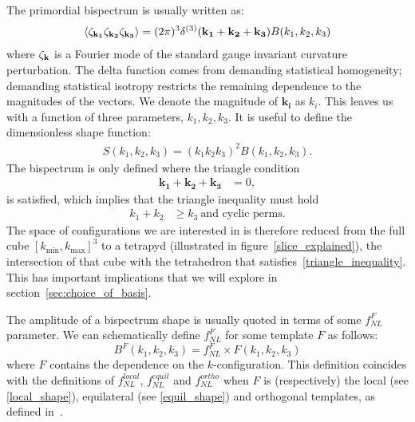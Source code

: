 \documentclass[a4paper,12pt]{extarticle}
\newcommand{\kmin}{{k_\text{min}}}
\newcommand{\kmax}{{k_\text{max}}}
\newcommand{\fnl}{f_{NL}}
\newcommand{\fnllocal}{f^{local}_{NL}}
\newcommand{\fnlequil}{f^{equil}_{NL}}
\newcommand{\fnlortho}{f^{ortho}_{NL}}
\begin{document}
The primordial bispectrum is usually written as:
\begin{align}
{
\left< \zeta_{\bf{k_1}}\zeta_{\bf{k_2}}\zeta_{\bf{k_3}} \right>
= (2\pi)^3\delta^{(3)}(\mathbf{k_1}+\mathbf{k_2}+\mathbf{k_3})B(k_1,k_2,k_3)
}
\end{align}
where $\zeta_{\bf{k}}$ is a Fourier mode of the standard gauge invariant curvature perturbation.
The delta function comes from demanding statistical homogeneity;
demanding statistical isotropy restricts the remaining dependence to the magnitudes of the vectors.
We denote the magnitude of $\mathbf{k_i}$ as $k_i$.
This leaves us with a function of three parameters,
$k_1,k_2,k_3$.
It is useful to define the dimensionless shape function:
\begin{align}\label{shapefn}
{
    S(k_1,k_2,k_3) = (k_1k_2k_3)^2B(k_1,k_2,k_3).
}
\end{align}
The bispectrum is only defined where the triangle condition
\begin{align}\label{triangle_condition}
    \mathbf{k_1}+\mathbf{k_2}+\mathbf{k_3} &= 0,
\end{align}
is satisfied, which implies that the triangle inequality must hold
\begin{align}\label{triangle_inequality}
    k_1+k_2 &\geq k_3~\text{and cyclic perms}.
\end{align}
The space of configurations we are interested in is therefore
reduced from the full cube $[\kmin,\kmax]^3$
to a tetrapyd (illustrated in figure~\ref{slice_explained}),
the intersection of that cube with the
tetrahedron that satisfies~\eqref{triangle_inequality}.
This has important implications that we will explore in
section~\ref{sec:choice_of_basis}. 


The amplitude of a bispectrum shape is usually
quoted in terms of some $\fnl^F$ parameter.
We can schematically define $\fnl^F$ for some template $F$ as follows:
\begin{equation}\label{def:fnl}
{
B^{F}(k_1,k_2,k_3) = \fnl^{F}\times F(k_1,k_2,k_3)
}
\end{equation}
where $F$ contains the dependence on the $k$-configuration.
This definition coincides with the definitions of
$\fnllocal$, $\fnlequil$ and $\fnlortho$
when $F$ is (respectively) the local (see \eqref{local_shape}),
equilateral (see \eqref{equil_shape}) and orthogonal templates,
as defined in~\cite{Planck_NG_2015}.
\end{document}
